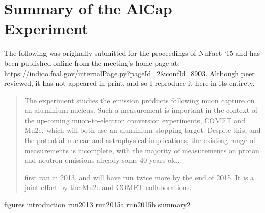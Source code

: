 \chapter{Summary of the AlCap Experiment}
The following was originally submitted for the proceedings of NuFact `15 and has been published online from the meeting's home page at: \url{https://indico.fnal.gov/internalPage.py?pageId=2&confId=8903}.
Although peer reviewed, it has not appeared in print, and so I reproduce it here in its entirety.


\begin{abstract}
	The \alcap experiment studies the emission products following muon capture on an aluminium nucleus.
	Such a measurement is important in the context of the up-coming muon-to-electron conversion experiments, COMET and Mu2e, which will
	both use an aluminium stopping target.  Despite this, and the potential nuclear and astrophysical implications, 
	the existing range of measurements is incomplete, with the majority of measurements on proton and neutron emissions already some 40 years old.

\alcap first ran in 2013, and will have run twice more by the end of 2015. 
It is a joint effort by the Mu2e and COMET collaborations.
\end{abstract}

\newenvironment{ruledtabular}{}{}

{figures}
{introduction}
{run2013}
{run2015a}
{run2015b}
{summary2}
